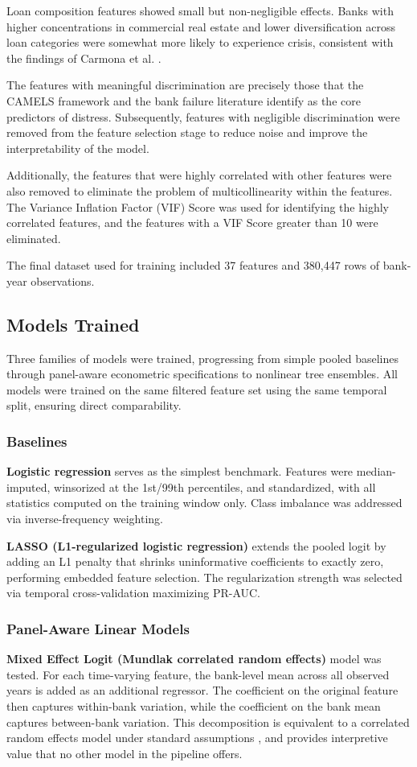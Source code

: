 \documentclass[conference]{IEEEtran}
\begin{document}
Loan composition features showed small but non-negligible effects. Banks with higher concentrations in commercial real estate and lower diversification across loan categories were somewhat more likely to experience crisis, consistent with the findings of Carmona et al. \cite{b8}. 

The features with meaningful discrimination are precisely those that the CAMELS framework and the bank failure literature identify as the core predictors of distress. Subsequently, features with negligible discrimination were removed from the feature selection stage to reduce noise and improve the interpretability of the model. 

Additionally, the features that were highly correlated with other features were also removed to eliminate the problem of multicollinearity within the features. The Variance Inflation Factor (VIF) Score was used for identifying the highly correlated features, and the features with a VIF Score greater than 10 were eliminated.

The final dataset used for training included 37 features and 380,447 rows of bank-year observations.


\subsection{Models Trained}
Three families of models were trained, progressing from simple pooled baselines through panel-aware econometric specifications to nonlinear tree ensembles. All models were trained on the same filtered feature set using the same temporal split, ensuring direct comparability.

\subsubsection{Baselines}
\textbf{Logistic regression} serves as the simplest benchmark. Features were median-imputed, winsorized at the 1st/99th percentiles, and standardized, with all statistics computed on the training window only. Class imbalance was addressed via inverse-frequency weighting. 

\textbf{LASSO (L1-regularized logistic regression)} extends the pooled logit by adding an L1 penalty that shrinks uninformative coefficients to exactly zero, performing embedded feature selection. The regularization strength was selected via temporal cross-validation maximizing PR-AUC. 

\subsubsection{Panel-Aware Linear Models}
\textbf{Mixed Effect Logit (Mundlak correlated random effects)} model was tested. For each time-varying feature, the bank-level mean across all observed years is added as an additional regressor. The coefficient on the original feature then captures within-bank variation, while the coefficient on the bank mean captures between-bank variation. This decomposition is equivalent to a correlated random effects model under standard assumptions \cite{b21}, \cite{b22} and provides interpretive value that no other model in the pipeline offers.
\end{document}
